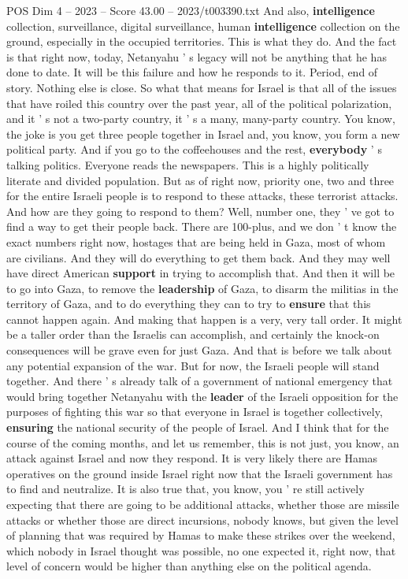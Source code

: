 \begin{textsample}{POS Dim 4 – 2023 – Score 43.00 – 2023/t003390.txt}
And also, \textbf{intelligence} collection, surveillance, digital surveillance, human \textbf{intelligence} collection on the ground, especially in the occupied territories.
This is what they do.
And the fact is that right now, today, Netanyahu ' s legacy will not be anything that he has done to date.
It will be this failure and how he responds to it.
Period, end of story.
Nothing else is close.
So what that means for Israel is that all of the issues that have roiled this country over the past year, all of the political polarization, and it ' s not a two-party country, it ' s a many, many-party country.
You know, the joke is you get three people together in Israel and, you know, you form a new political party.
And if you go to the coffeehouses and the rest, \textbf{everybody} ' s talking politics.
Everyone reads the newspapers.
This is a highly politically literate and divided population.
But as of right now, priority one, two and three for the entire Israeli people is to respond to these attacks, these terrorist attacks.
And how are they going to respond to them?
Well, number one, they ' ve got to find a way to get their people back.
There are 100-plus, and we don ' t know the exact numbers right now, hostages that are being held in Gaza, most of whom are civilians.
And they will do everything to get them back.
And they may well have direct American \textbf{support} in trying to accomplish that.
And then it will be to go into Gaza, to remove the \textbf{leadership} of Gaza, to disarm the militias in the territory of Gaza, and to do everything they can to try to \textbf{ensure} that this cannot happen again.
And making that happen is a very, very tall order.
It might be a taller order than the Israelis can accomplish, and certainly the knock-on consequences will be grave even for just Gaza.
And that is before we talk about any potential expansion of the war.
But for now, the Israeli people will stand together.
And there ' s already talk of a government of national emergency that would bring together Netanyahu with the \textbf{leader} of the Israeli opposition for the purposes of fighting this war so that everyone in Israel is together collectively, \textbf{ensuring} the national security of the people of Israel.
And I think that for the course of the coming months, and let us remember, this is not just, you know, an attack against Israel and now they respond.
It is very likely there are Hamas operatives on the ground inside Israel right now that the Israeli government has to find and neutralize.
It is also true that, you know, you ' re still actively expecting that there are going to be additional attacks, whether those are missile attacks or whether those are direct incursions, nobody knows, but given the level of planning that was required by Hamas to make these strikes over the weekend, which nobody in Israel thought was possible, no one expected it, right now, that level of concern would be higher than anything else on the political agenda.

\end{textsample}
